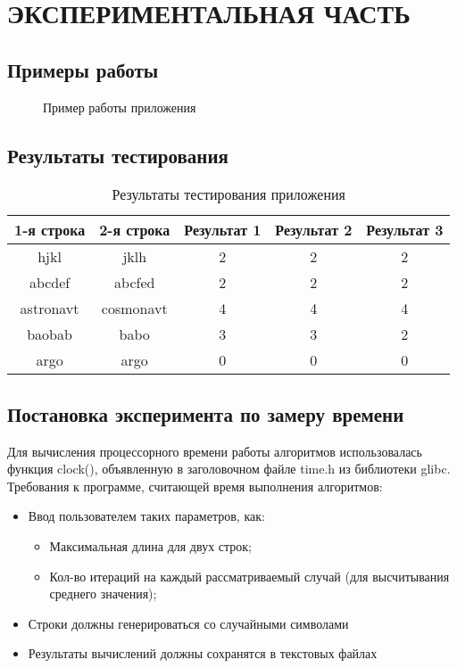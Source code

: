 \newpage
\section{ЭКСПЕРИМЕНТАЛЬНАЯ ЧАСТЬ}

\subsection{Примеры работы}
\begin{figure}[h]
\caption{Пример работы приложения}
\label{images:example}
\end{figure}

\newpage
\subsection{Результаты тестирования}
\begin{table}[h]
\caption{\label{tablice:tests}Результаты тестирования приложения}
\begin{center}
\begin{tabular}{|c|c|c|c|c|}
\hline 
1-я строка & 2-я строка & Результат 1 & Результат 2 & Результат 3 \\ 
\hline 
hjkl & jklh & 2 & 2 & 2 \\ 
\hline 
abcdef & abcfed & 2 & 2 & 2 \\ 
\hline 
astronavt & cosmonavt & 4 & 4 & 4 \\ 
\hline 
baobab & babo & 3 & 3 & 2 \\ 
\hline 
argo & argo & 0 & 0 & 0 \\ 
\hline 
\end{tabular}
\end{center} 
\end{table}

\newpage
\subsection{Постановка эксперимента по замеру времени}
\begin{flushleft}
Для вычисления процессорного времени работы алгоритмов использовалась функция clock(), объявленную в заголовочном файле time.h из библиотеки glibc. \\
Требования к программе, считающей время выполнения алгоритмов:
\begin{itemize}
\item Ввод пользователем таких параметров, как:
\begin{itemize}
\item Максимальная длина для двух строк;
\item Кол-во итераций на каждый рассматриваемый случай (для высчитывания среднего значения);
\end{itemize}
\item Строки должны генерироваться со случайными символами
\item Результаты вычислений должны сохранятся в текстовых файлах
\end{itemize}
\end{flushleft}

